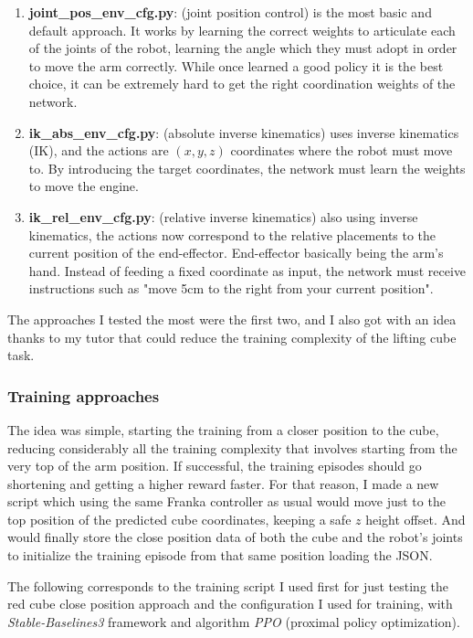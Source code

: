 \begin{enumerate}
	\item \textbf{joint\_pos\_env\_cfg.py}: (joint position control) is the most basic and default approach. It works by learning the correct weights to articulate each of the joints of the robot, learning the angle which they must adopt in order to move the arm correctly. While once learned a good policy it is the best choice, it can be extremely hard to get the right coordination weights of the network. 
	
	\item \textbf{ik\_abs\_env\_cfg.py}: (absolute inverse kinematics) uses inverse kinematics (IK), and the actions are $(x,y,z)$ coordinates where the robot must move to. By introducing the target coordinates, the network must learn the weights to move the engine. 
	
	\item \textbf{ik\_rel\_env\_cfg.py}: (relative inverse kinematics) also using inverse kinematics, the actions now correspond to the relative placements to the current position of the end-effector. End-effector basically being the arm's hand. Instead of feeding a fixed coordinate as input, the network must receive instructions such as "move 5cm to the right from your current position". 
\end{enumerate}

The approaches I tested the most were the first two, and I also got with an idea thanks to my tutor that could reduce the training complexity of the lifting cube task. 

\subsubsection{Training approaches}
\label{sec:training_approaches}
The idea was simple, starting the training from a closer position to the cube, reducing considerably all the training complexity that involves starting from the very top of the arm position. If successful, the training episodes should go shortening and getting a higher reward faster. For that reason, I made a new script which using the same Franka controller as usual would move just to the top position of the predicted cube coordinates, keeping a safe $z$ height offset. And would finally store the close position data of both the cube and the robot's joints to initialize the training episode from that same position loading the JSON. 

The following corresponds to the training script I used first for just testing the red cube close position approach and the configuration I used for training, with \textit{Stable-Baselines3} framework and algorithm \textit{PPO} (proximal policy optimization).

